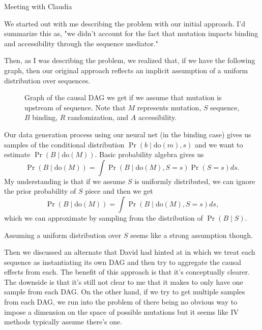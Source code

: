\begin{Minutes}{Meeting with Claudia}
\maketitle
{}
We started out with me describing the problem with our initial approach. I'd summarize this as, "we didn't account for the fact that mutation impacts binding and accessibility through the sequence mediator."

Then, as I was describing the problem, we realized that, if we have the following graph, then our original approach reflects an implicit assumption of a uniform distribution over sequences.
\begin{figure}[ht]
  \begin{center}
      
  \end{center}
  \caption{Graph of the causal DAG we get if we assume that mutation is upstream of sequence. Note that $ M $ represents mutation, $ S $ sequence, $ B $ binding, $ R $ randomization, and $ A $ accessibility.}
\end{figure}

Our data generation process using our neural net (in the binding case) gives us samples of the conditional distribution \( \Pr(b \mid \text{do}(m), s) \) and we want to estimate \( \Pr(B \mid \text{do}(M)) \). Basic probability algebra gives us
\[ \Pr(B \mid \text{do}(M)) = \int \Pr(B \mid \text{do}(M), S = s) \Pr(S = s) ds. \]
My understanding is that if we assume $ S $ is uniformly distributed, we can ignore the prior probability of $ S $ piece and then we get
\[ \Pr(B \mid \text{do}(M)) = \int \Pr(B \mid \text{do}(M), S=s) ds, \]
which we can approximate by sampling from the distribution of $ \Pr(B \mid S) $.

Assuming a uniform distribution over $ S $ seems like a strong assumption though.

Then we discussed an alternate that David had hinted at in which we treat each sequence as instantiating its own DAG and then try to aggregate the causal effects from each. The benefit of this approach is that it's conceptually clearer. The downside is that it's still not clear to me that it makes to only have one sample from each DAG. On the other hand, if we try to get multiple samples from each DAG, we run into the problem of there being no obvious way to impose a dimension on the space of possible mutations but it seems like IV methods typically assume there's one.


\end{Minutes}
